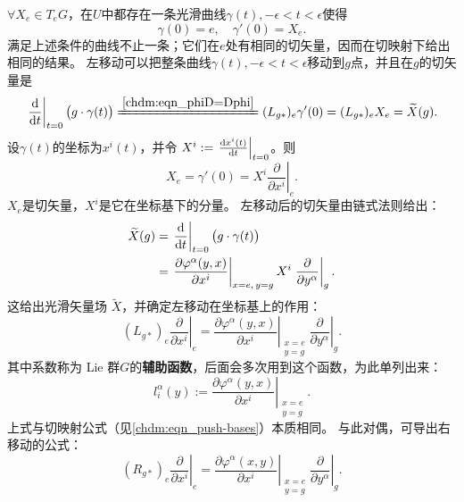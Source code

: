 $\forall X_e \in T_eG$，在$U$中都存在一条光滑曲线$\gamma(t),-\epsilon < t < \epsilon$使得
\begin{equation}
    \gamma(0)=e,\quad \gamma'(0)=X_e .
\end{equation}
满足上述条件的曲线不止一条；它们在$e$处有相同的切矢量，因而在切映射下给出相同的结果。
左移动可以把整条曲线$\gamma(t),-\epsilon < t < \epsilon$移动到$g$点，并且在$g$的切矢量是
\begin{equation}\label{chlg:eqn_tmpl10}
    \left. \frac\d {\d t} \right|_{t=0} \bigl(g\cdot \gamma(t) \bigr)
    \xlongequal{\ref{chdm:eqn_phiD=Dphi}} (L_{g*})_e \gamma'(0) = (L_{g*})_e X_e  = \widetilde{X}(g) .
\end{equation}
设$\gamma(t)$的坐标为$x^i(t)$，并令
$X^i:=\left.\frac{\dd x^i(t)}{\dd t}\right|_{t=0}$。则
\begin{equation}
    X_e=\gamma'(0)=X^i\left.\frac{\partial}{\partial x^i}\right|_e.
\end{equation}
$X_e$是切矢量，$X^i$是它在坐标基下的分量。
左移动后的切矢量由链式法则给出：
\begin{align*}
    \widetilde X(g)
    &=\left.\frac{\dd }{\dd t}\right|_{t=0}\bigl(g\cdot\gamma(t)\bigr)\\
    &=\left.\frac{\partial\varphi^\alpha(y,x)}{\partial x^i}\right|_{x=e,\,y=g}
      X^i\left.\frac{\partial}{\partial y^\alpha}\right|_g.
\end{align*}
这给出光滑矢量场 $\widetilde X$，并确定左移动在坐标基上的作用：
\begin{equation}\label{chlg:eqn_lve}
    (L_{g*})_e\left. \frac{\partial }{\partial x^i }\right|_{e}
    = \left. \frac{\partial \varphi^\alpha (y,x)}{\partial x^i}
    \right|_{\substack{x=e\\y=g}}   \left. \frac{\partial}{\partial y^\alpha}\right|_{g} .
\end{equation}
其中系数称为 Lie 群$G$的\textbf{辅助函数}，后面会多次用到这个函数，为此单列出来：
\begin{equation}\label{chlg:eqn_auxiliaryfun}
    l^\alpha_i(y) := \left. \frac{\partial \varphi^\alpha (y,x)}
     {\partial x^i}\right|_{\substack{x=e\\y=g}}.
\end{equation}
上式与切映射公式（见\eqref{chdm:eqn_push-bases}）本质相同。
与此对偶，可导出右移动的公式：
\begin{equation}\label{chlg:eqn_rve}
    (R_{g*})_e \left. \frac{\partial }{\partial x^i }\right|_{e}
     = \left. \frac{\partial \varphi^\alpha (x,y)}{\partial x^i}
    \right|_{\substack{x=e\\y=g}}   \left. \frac{\partial}{\partial y^\alpha}\right|_{g} .
\end{equation}


